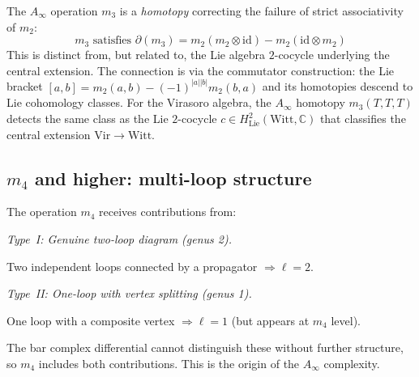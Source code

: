 \begin{remark}
\label{rem:m3-hochschild}
The $A_\infty$ operation $m_3$ is a \emph{homotopy} correcting the failure of strict associativity of $m_2$:
\[m_3 \text{ satisfies } \partial(m_3) = m_2(m_2 \otimes \mathrm{id}) - m_2(\mathrm{id} \otimes m_2)\]
This is distinct from, but related to, the Lie algebra $2$-cocycle underlying the central extension.  The connection is via the commutator construction: the Lie bracket $[a,b] = m_2(a,b) - (-1)^{|a||b|}m_2(b,a)$ and its homotopies descend to Lie cohomology classes.  For the Virasoro algebra, the $A_\infty$ homotopy $m_3(T,T,T)$ detects the same class as the Lie $2$-cocycle $c \in H^2_{\mathrm{Lie}}(\mathrm{Witt}, \mathbb{C})$ that classifies the central extension $\mathrm{Vir} \to \mathrm{Witt}$.
\end{remark}

\subsection{\texorpdfstring{$m_4$ and higher: multi-loop structure}{m 4 and higher: multi-loop structure}}

\begin{example}
\label{ex:m4-two-loop}
The operation $m_4$ receives contributions from:

\emph{Type~I: Genuine two-loop diagram (genus 2).}

Two independent loops connected by a propagator $\Rightarrow \ell = 2$.

\emph{Type~II: One-loop with vertex splitting (genus 1).}

One loop with a composite vertex $\Rightarrow \ell = 1$ (but appears at $m_4$ level).

The bar complex differential cannot distinguish these without further structure, so 
$m_4$ includes both contributions. This is the origin of the $A_\infty$ complexity.
\end{example}

